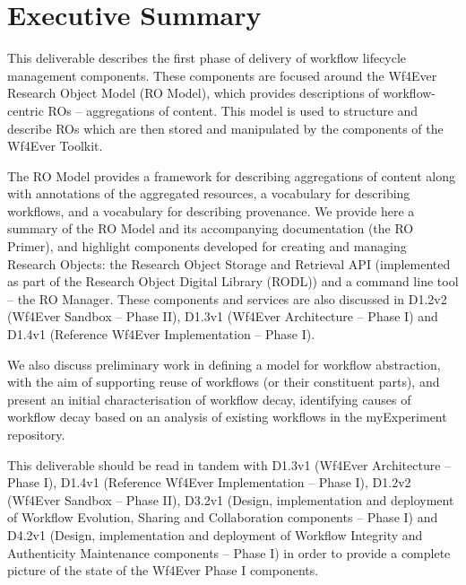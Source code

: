 \documentclass[a4paper, twoside, 11pt]{article}
\begin{document}
\section*{Executive Summary}
This deliverable describes the first phase of delivery of workflow
lifecycle management components. These components are focused around
the Wf4Ever Research Object Model (RO Model), which provides
descriptions of workflow-centric ROs -- aggregations of content. This
model is used to structure and describe ROs which are then stored and
manipulated by the components of the Wf4Ever Toolkit.

The RO Model provides a framework for describing aggregations of
content along with annotations of the aggregated resources, a
vocabulary for describing workflows, and a vocabulary for describing
provenance. We provide here a summary of the RO Model and its
accompanying documentation (the RO Primer), and highlight components
developed for creating and managing Research Objects: the
Research Object Storage and Retrieval API (implemented as part of the
Research Object Digital Library (RODL)) and a command line tool -- the
RO Manager. These components and services are also discussed in D1.2v2
(Wf4Ever Sandbox -- Phase II), D1.3v1 (Wf4Ever Architecture -- Phase
I) and D1.4v1 (Reference Wf4Ever Implementation -- Phase I).

We also discuss preliminary work in defining a model for workflow
abstraction, with the aim of supporting reuse of workflows (or their
constituent parts), and present an initial characterisation of
workflow decay, identifying causes of workflow decay based on an
analysis of existing workflows in the myExperiment repository.

This deliverable should be read in tandem with D1.3v1 (Wf4Ever
Architecture -- Phase I), D1.4v1 (Reference Wf4Ever Implementation --
Phase I), D1.2v2 (Wf4Ever Sandbox -- Phase II), D3.2v1 (Design,
implementation and deployment of Workflow Evolution, Sharing and
Collaboration components -- Phase I) and D4.2v1 (Design,
implementation and deployment of Workflow Integrity and Authenticity
Maintenance components -- Phase I) in order to provide a complete
picture of the state of the Wf4Ever Phase I components.

\clearpage

\tableofcontents
\clearpage
\listoftables %
\listoffigures %

\clearpage
\sloppy
\end{document}
